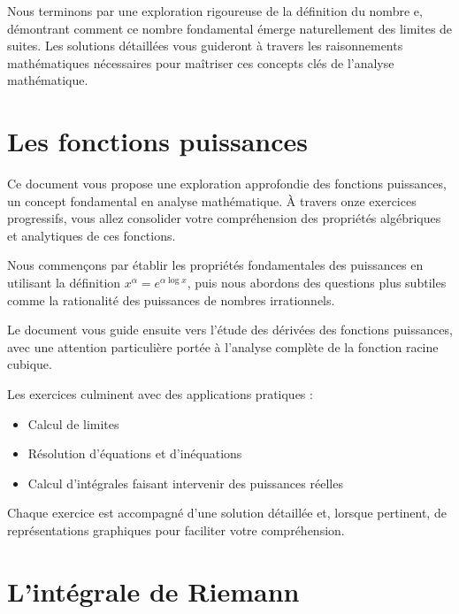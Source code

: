 \documentclass[
  12pt,
  letterpaper,
]{book}
\providecommand{\tightlist}{%
  \setlength{\itemsep}{0pt}\setlength{\parskip}{0pt}}\usepackage{longtable,booktabs,array}
\theoremstyle{remark}
\begin{document}
Nous terminons par une exploration rigoureuse de la définition du nombre
e, démontrant comment ce nombre fondamental émerge naturellement des
limites de suites. Les solutions détaillées vous guideront à travers les
raisonnements mathématiques nécessaires pour maîtriser ces concepts clés
de l'analyse mathématique.

\section*{Les fonctions puissances}\label{les-fonctions-puissances}


Ce document vous propose une exploration approfondie des fonctions
puissances, un concept fondamental en analyse mathématique. À travers
onze exercices progressifs, vous allez consolider votre compréhension
des propriétés algébriques et analytiques de ces fonctions.

Nous commençons par établir les propriétés fondamentales des puissances
en utilisant la définition \(x^{\alpha} = e^{\alpha \log x}\), puis nous
abordons des questions plus subtiles comme la rationalité des puissances
de nombres irrationnels.

Le document vous guide ensuite vers l'étude des dérivées des fonctions
puissances, avec une attention particulière portée à l'analyse complète
de la fonction racine cubique.

Les exercices culminent avec des applications pratiques :

\begin{itemize}
\tightlist
\item
  Calcul de limites
\item
  Résolution d'équations et d'inéquations
\item
  Calcul d'intégrales faisant intervenir des puissances réelles
\end{itemize}

Chaque exercice est accompagné d'une solution détaillée et, lorsque
pertinent, de représentations graphiques pour faciliter votre
compréhension.

\section*{L'intégrale de Riemann}\label{lintuxe9grale-de-riemann}
\end{document}
